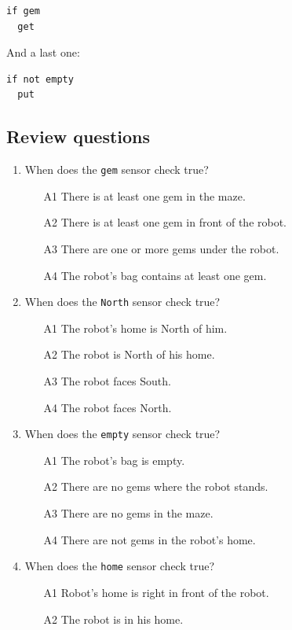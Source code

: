 \documentclass[article,A4,12pt]{llncs}
\begin{document}
{{{{\begin{verbatim}
if gem
  get
\end{verbatim}
And a last one:
 
\begin{verbatim}
if not empty
  put
\end{verbatim}

\subsection{Review questions}

\begin{enumerate}
\item When does the {\tt gem} sensor check true?
\begin{enumerate}
\item[A1] There is at least one gem in the maze.
\item[A2] There is at least one gem in front of the robot.
\item[A3] There are one or more gems under the robot.
\item[A4] The robot's bag contains at least one gem.
\end{enumerate}
\item When does the {\tt North} sensor check true?
\begin{enumerate}
\item[A1] The robot's home is North of him.
\item[A2] The robot is North of his home.
\item[A3] The robot faces South.
\item[A4] The robot faces North.
\end{enumerate}
\item When does the {\tt empty} sensor check true?
\begin{enumerate}
\item[A1] The robot's bag is empty.
\item[A2] There are no gems where the robot stands.
\item[A3] There are no gems in the maze.
\item[A4] There are not gems in the robot's home.
\end{enumerate}
\item When does the {\tt home} sensor check true?
\begin{enumerate}
\item[A1] Robot's home is right in front of the robot.
\item[A2] The robot is in his home.

\end{enumerate}
\end{enumerate}}}}}
\end{document}
